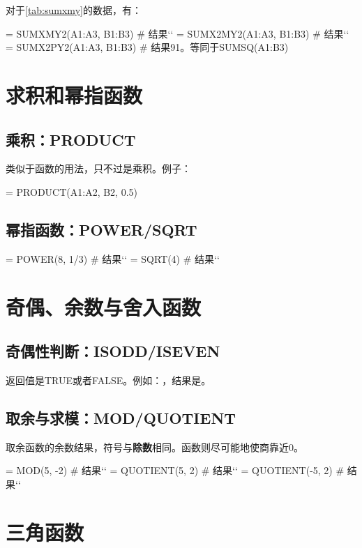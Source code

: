 对于\autoref{tab:sumxmy}的数据，有：
\begin{excode}
= SUMXMY2(A1:A3, B1:B3)  # 结果``
= SUMX2MY2(A1:A3, B1:B3)  # 结果``
= SUMX2PY2(A1:A3, B1:B3)  # 结果91。等同于SUMSQ(A1:B3)
\end{excode}

\section{求积和幂指函数}
\subsection{乘积：PRODUCT}
类似于函数的用法，只不过是乘积。例子：
\begin{excode}
= PRODUCT(A1:A2, B2, 0.5)
\end{excode}

\subsection{幂指函数：POWER/SQRT}
\begin{excode}
= POWER(8, 1/3)  # 结果``
= SQRT(4)  # 结果``
\end{excode}

\section{奇偶、余数与舍入函数}
\subsection{奇偶性判断：ISODD/ISEVEN}
返回值是TRUE或者FALSE。例如：，结果是。

\subsection{取余与求模：MOD/QUOTIENT}
取余函数的余数结果，符号与\textbf{除数}相同。函数则尽可能地使商靠近0。
\begin{excode}
= MOD(5, -2)  # 结果`` 
= QUOTIENT(5, 2)  # 结果``
= QUOTIENT(-5, 2)  # 结果``
\end{excode}

\section{三角函数}

